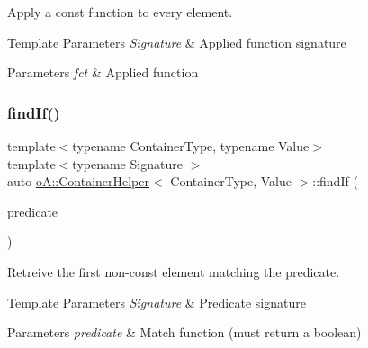 Apply a const function to every element. 


\begin{DoxyTemplParams}{Template Parameters}
{\em Signature} & Applied function signature \\
\hline
\end{DoxyTemplParams}

\begin{DoxyParams}{Parameters}
{\em fct} & Applied function \\
\hline
\end{DoxyParams}
\mbox{\label{classo_a_1_1_container_helper_af2ed8bdecb2d870ba366ee56d7e6b90a}} 
\subsubsection{\texorpdfstring{find\+If()}{findIf()}\hspace{0.1cm}{\footnotesize\ttfamily [1/4]}}
{\footnotesize\ttfamily template$<$typename Container\+Type, typename Value$>$ \\
template$<$typename Signature $>$ \\
auto \mbox{\hyperlink{classo_a_1_1_container_helper}{o\+A\+::\+Container\+Helper}}$<$ Container\+Type, Value $>$\+::find\+If (\begin{DoxyParamCaption}\item[{const Signature \&}]{predicate }\end{DoxyParamCaption})\hspace{0.3cm}{\ttfamily [inline]}}



Retreive the first non-\/const element matching the predicate. 


\begin{DoxyTemplParams}{Template Parameters}
{\em Signature} & Predicate signature \\
\hline
\end{DoxyTemplParams}

\begin{DoxyParams}{Parameters}
{\em predicate} & Match function (must return a boolean) \\
\hline
\end{DoxyParams}
\mbox{\label{classo_a_1_1_container_helper_accea76cd23603fc42db7b46081f5cc8d}} 
